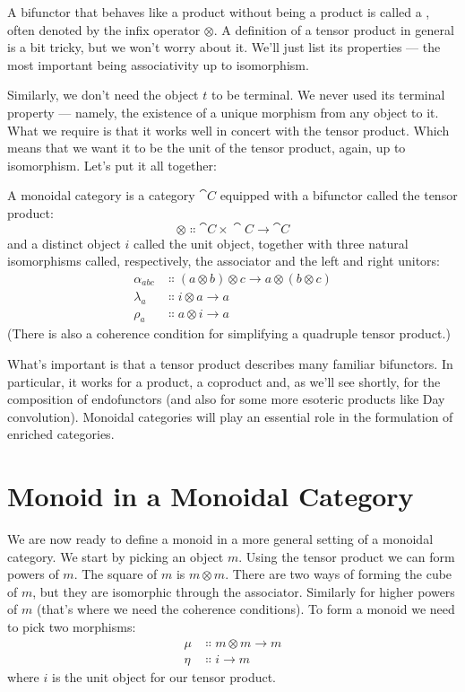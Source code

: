 A bifunctor that behaves like a product without being a product is
called a , often denoted by the infix operator $\otimes$. A
definition of a tensor product in general is a bit tricky, but we won't
worry about it. We'll just list its properties --- the most important
being associativity up to isomorphism.

Similarly, we don't need the object $t$ to be terminal. We never
used its terminal property --- namely, the existence of a unique
morphism from any object to it. What we require is that it works well in
concert with the tensor product. Which means that we want it to be the
unit of the tensor product, again, up to isomorphism. Let's put it all
together:

A monoidal category is a category $\cat{C}$ equipped with a bifunctor
called the tensor product:
\[\otimes \Colon \cat{C}\times{}\cat{C} \to \cat{C}\]
and a distinct object $i$ called the unit object, together with
three natural isomorphisms called, respectively, the associator and the
left and right unitors:
\begin{align*}
\alpha_{a b c} &\Colon (a \otimes b) \otimes c \to a \otimes (b \otimes c) \\
\lambda_a &\Colon i \otimes a \to a \\
\rho_a &\Colon a \otimes i \to a
\end{align*}
(There is also a coherence condition for simplifying a quadruple tensor
product.)

What's important is that a tensor product describes many familiar
bifunctors. In particular, it works for a product, a coproduct and, as
we'll see shortly, for the composition of endofunctors (and also for
some more esoteric products like Day convolution). Monoidal categories
will play an essential role in the formulation of enriched categories.

\section{Monoid in a Monoidal Category}

We are now ready to define a monoid in a more general setting of a
monoidal category. We start by picking an object $m$. Using the
tensor product we can form powers of $m$. The square of
$m$ is $m \otimes m$. There are two ways of forming the cube
of $m$, but they are isomorphic through the associator. Similarly
for higher powers of $m$ (that's where we need the coherence
conditions). To form a monoid we need to pick two morphisms:
\begin{align*}
\mu &\Colon m \otimes m \to m \\
\eta &\Colon i \to m
\end{align*}
where $i$ is the unit object for our tensor product.

